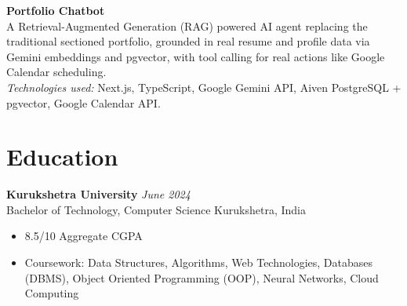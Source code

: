 \documentclass[10pt,a4paper]{article}
\newcommand{\entry}[4]{%
  \noindent\textbf{#1} \hfill \textit{#2}\\
  \noindent#3 \hfill #4\\[2pt]%
}
\begin{document}
\vspace{2pt}
\noindent\textbf{Portfolio Chatbot}\\
A \mbox{Retrieval-Augmented} Generation (RAG) powered AI agent replacing the traditional sectioned portfolio, grounded in real resume and profile data via Gemini embeddings and pgvector, with tool calling for real actions like Google Calendar scheduling.\\
\textit{Technologies used:} Next.js, TypeScript, Google Gemini API, Aiven PostgreSQL + pgvector, Google Calendar API.

\section*{Education}
\entry{Kurukshetra University}{June 2024}{Bachelor of Technology, Computer Science}{Kurukshetra, India}
\begin{itemize}
  \item 8.5/10 Aggregate CGPA
  \item Coursework: Data Structures, Algorithms, Web Technologies, Databases (DBMS), Object Oriented Programming (OOP), Neural Networks, Cloud Computing
\end{itemize}
\end{document}
